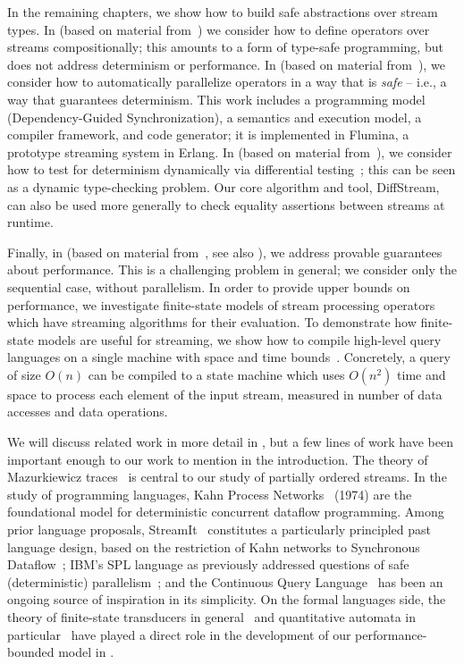 In the remaining chapters, we show how to build safe abstractions over stream types.
In  (based on material from~) we consider how to define operators over streams compositionally; this amounts to a form of type-safe programming, but does not address determinism or performance.
In  (based on material from~), we consider how to automatically parallelize operators in a way that is \emph{safe} -- i.e., a way that guarantees determinism. This work includes a programming model (Dependency-Guided Synchronization), a semantics and execution model, a compiler framework, and code generator; it is implemented in Flumina, a prototype streaming system in Erlang.
In  (based on material from~), we
consider how to test for determinism dynamically via differential testing~\cite{mckeeman1998differential}; this can be seen as a dynamic
type-checking problem. Our core algorithm and tool, DiffStream, can also be used more generally to check equality assertions between streams at runtime.

Finally, in  (based on material from~, see also ), we address provable guarantees about performance. This is a challenging problem in general; we consider only the sequential case, without parallelism. In order to provide upper bounds on performance, we investigate finite-state models of stream processing operators which have streaming algorithms for their evaluation. To demonstrate how finite-state models are useful for streaming, we show how to compile high-level query languages on a single machine with space and time bounds~\cite{QRE,StreamQRE}. Concretely, a query of size $O(n)$ can be compiled to a state machine which uses $O(n^2)$ time and space to process each element of the input stream, measured in number of data accesses and data operations.

We will discuss related work in more detail in , but a few lines of work have been important enough to our work to mention in the introduction.
The theory of Mazurkiewicz traces~\cite{mazurkiewicz1986trace,DiekertR1995} is central to our study of partially ordered streams.
In the study of programming languages, Kahn Process Networks~\cite{gilles1974semantics} (1974) are the foundational model for deterministic concurrent dataflow programming.
Among prior language proposals, StreamIt~\cite{thies2002streamit} constitutes a particularly principled past language design, based on the restriction of Kahn networks to Synchronous Dataflow~\cite{lee1987synchronous};
IBM's SPL language as previously addressed questions of safe (deterministic) parallelism~\cite{HAG2013SPL,schneider2013safe,hirzel2014catalog};
and the Continuous Query Language~\cite{arasu2003cql,ABW2006CQL} has been an ongoing source of inspiration in its simplicity.
On the formal languages side,
the theory of finite-state transducers in general~\cite{EH2001MDST,AC2010SST}
and quantitative automata in particular~\cite{S1961WA,DKV2009HWA,AdADRY2013CRA}
have played a direct role in the development of our performance-bounded
model in .

